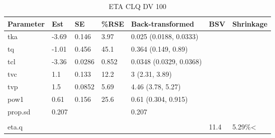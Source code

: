 \begin{table}
\centering\centering
\caption{ETA CLQ DV 100}
\centering
\fontsize{8}{10}\selectfont
\begin{tabular}[t]{lllllll}
\toprule
\textbf{Parameter} & \textbf{Est} & \textbf{SE} & \textbf{\%RSE} & \textbf{Back-transformed} & \textbf{BSV} & \textbf{Shrinkage}\\
\midrule
tka & -3.69 & 0.146 & 3.97 & 0.025 (0.0188, 0.0333) &  & \\
\midrule
tq & -1.01 & 0.456 & 45.1 & 0.364 (0.149, 0.89) &  & \\
\midrule
tcl & -3.36 & 0.0286 & 0.852 & 0.0348 (0.0329, 0.0368) &  & \\
\midrule
tvc & 1.1 & 0.133 & 12.2 & 3 (2.31, 3.89) &  & \\
\midrule
tvp & 1.5 & 0.0852 & 5.69 & 4.46 (3.78, 5.27) &  & \\
\midrule
pow1 & 0.61 & 0.156 & 25.6 & 0.61 (0.304, 0.915) &  & \\
\midrule
prop.sd & 0.207 &  &  & 0.207 &  & \\
\midrule\\
eta.q &  &  &  &  & 11.4 & 5.29\%<\\
\bottomrule
\end{tabular}
\end{table}